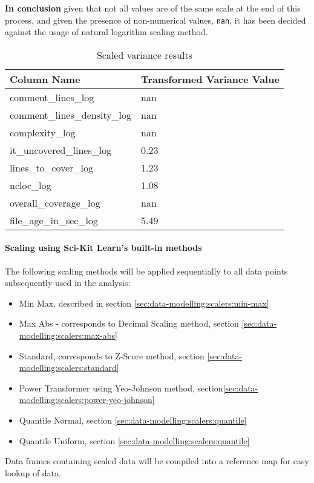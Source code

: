 \textbf{In conclusion} given that not all values are of the same scale at the end of this process, and given the presence of non-numerical values, \texttt{nan}, it has been decided against the usage of natural logarithm scaling method.
\begin{table}[!h]
\centering
\caption{Scaled variance results}
\label{tbl:loge-scaler-cols-transformed}
\begin{tabular}{@{}ll@{}}
\toprule
Column Name & Transformed Variance Value \\ \midrule
comment\_lines\_log & nan \\
comment\_lines\_density\_log & nan \\
complexity\_log & nan \\
it\_uncovered\_lines\_log & 0.23 \\
lines\_to\_cover\_log & 1.23 \\
ncloc\_log & 1.08 \\
overall\_coverage\_log & nan \\
file\_age\_in\_sec\_log & 5.49 \\ \bottomrule
\end{tabular}
\end{table}


\paragraph{Scaling using Sci-Kit Learn's built-in methods}
The following scaling methods will be applied sequentially to all data points subsequently used in the analysis:
\begin{itemize}
    \item Min Max, described in section \ref{sec:data-modelling:scalers:min-max}
    \item Max Abs - corresponds to Decimal Scaling method, section \ref{sec:data-modelling:scalers:max-abs}
    \item Standard, corresponds to Z-Score method, section \ref{sec:data-modelling:scalers:standard}
    \item Power Transformer using Yeo-Johnson method, section\ref{sec:data-modelling:scalers:power-yeo-johnson}
    \item Quantile Normal, section \ref{sec:data-modelling:scalers:quantile}
    \item Quantile Uniform, section \ref{sec:data-modelling:scalers:quantile}
\end{itemize}

Data frames containing scaled data will be compiled into a reference map for easy lookup of data.


